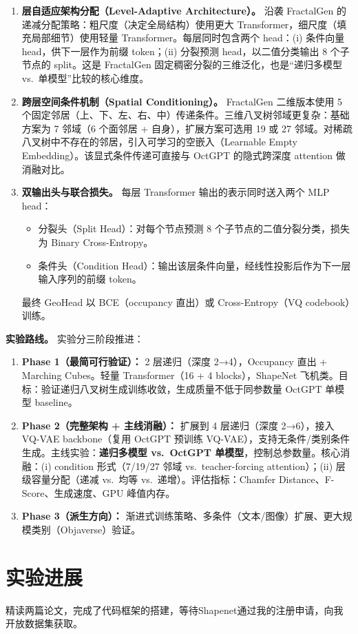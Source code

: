 \documentclass[12pt,a4paper]{article}
\begin{document}
\begin{enumerate}
    \item \textbf{层自适应架构分配（Level-Adaptive Architecture）。} 沿袭 FractalGen 的递减分配策略：粗尺度（决定全局结构）使用更大 Transformer，细尺度（填充局部细节）使用轻量 Transformer。每层同时包含两个 head：(i) 条件向量 head，供下一层作为前缀 token；(ii) 分裂预测 head，以二值分类输出 8 个子节点的 split。这是 FractalGen 固定稠密分裂的三维泛化，也是“递归多模型 vs.\ 单模型”比较的核心维度。

    \item \textbf{跨层空间条件机制（Spatial Conditioning）。} FractalGen 二维版本使用 5 个固定邻居（上、下、左、右、中）传递条件。三维八叉树邻域更复杂：基础方案为 7 邻域（6 个面邻居 + 自身），扩展方案可选用 19 或 27 邻域。对稀疏八叉树中不存在的邻居，引入可学习的空嵌入（Learnable Empty Embedding）。该显式条件传递可直接与 OctGPT 的隐式跨深度 attention 做消融对比。

    \item \textbf{双输出头与联合损失。} 每层 Transformer 输出的表示同时送入两个 MLP head：
    \begin{itemize}
        \item 分裂头（Split Head）：对每个节点预测 8 个子节点的二值分裂分类，损失为 Binary Cross-Entropy。
        \item 条件头（Condition Head）：输出该层条件向量，经线性投影后作为下一层输入序列的前缀 token。
    \end{itemize}
    最终 GeoHead 以 BCE（occupancy 直出）或 Cross-Entropy（VQ codebook）训练。
\end{enumerate}

\textbf{实验路线。}
实验分三阶段推进：
\begin{enumerate}
    \item \textbf{Phase 1（最简可行验证）：} 2 层递归（深度 2→4），Occupancy 直出 + Marching Cubes。轻量 Transformer（16 + 4 blocks），ShapeNet 飞机类。目标：验证递归八叉树生成训练收敛，生成质量不低于同参数量 OctGPT 单模型 baseline。
    \item \textbf{Phase 2（完整架构 + 主线消融）：} 扩展到 4 层递归（深度 2→6），接入 VQ-VAE backbone（复用 OctGPT 预训练 VQ-VAE），支持无条件/类别条件生成。主线实验：\textbf{递归多模型 vs.\ OctGPT 单模型}，控制总参数量。核心消融：(i) condition 形式（7/19/27 邻域 vs.\ teacher-forcing attention）；(ii) 层级容量分配（递减 vs.\ 均等 vs.\ 递增）。评估指标：Chamfer Distance、F-Score、生成速度、GPU 峰值内存。
    \item \textbf{Phase 3（派生方向）：} 渐进式训练策略、多条件（文本/图像）扩展、更大规模类别（Objaverse）验证。
\end{enumerate}

\section{实验进展}

精读两篇论文，完成了代码框架的搭建，等待Shapenet通过我的注册申请，向我开放数据集获取。





\end{document}
